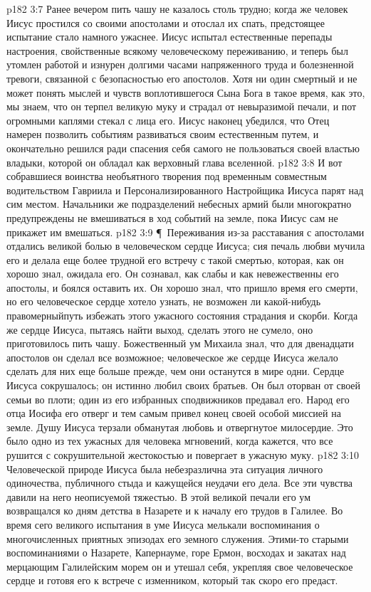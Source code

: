 \vs p182 3:7 Ранее вечером пить чашу не казалось столь трудно; когда же человек Иисус простился со своими апостолами и отослал их спать, предстоящее испытание стало намного ужаснее. Иисус испытал естественные перепады настроения, свойственные всякому человеческому переживанию, и теперь был утомлен работой и изнурен долгими часами напряженного труда и болезненной тревоги, связанной с безопасностью его апостолов. Хотя ни один смертный и не может понять мыслей и чувств воплотившегося Сына Бога в такое время, как это, мы знаем, что он терпел великую муку и страдал от невыразимой печали, и пот огромными каплями стекал с лица его. Иисус наконец убедился, что Отец намерен позволить событиям развиваться своим естественным путем, и окончательно решился ради спасения себя самого не пользоваться своей властью владыки, которой он обладал как верховный глава вселенной.
\vs p182 3:8 И вот собравшиеся воинства необъятного творения под временным совместным водительством Гавриила и Персонализированного Настройщика Иисуса парят над сим местом. Начальники же подразделений небесных армий были многократно предупреждены не вмешиваться в ход событий на земле, пока Иисус сам не прикажет им вмешаться.
\vs p182 3:9 \P\ Переживания из\hyp{}за расставания с апостолами отдались великой болью в человеческом сердце Иисуса; сия печаль любви мучила его и делала еще более трудной его встречу с такой смертью, которая, как он хорошо знал, ожидала его. Он сознавал, как слабы и как невежественны его апостолы, и боялся оставить их. Он хорошо знал, что пришло время его смерти, но его человеческое сердце хотело узнать, не возможен ли какой\hyp{}нибудь правомерныйпуть избежать этого ужасного состояния страдания и скорби. Когда же сердце Иисуса, пытаясь найти выход, сделать этого не сумело, оно приготовилось пить чашу. Божественный ум Михаила знал, что для двенадцати апостолов он сделал все возможное; человеческое же сердце Иисуса желало сделать для них еще больше прежде, чем они останутся в мире одни. Сердце Иисуса сокрушалось; он истинно любил своих братьев. Он был оторван от своей семьи во плоти; один из его избранных сподвижников предавал его. Народ его отца Иосифа его отверг и тем самым привел конец своей особой миссией на земле. Душу Иисуса терзали обманутая любовь и отвергнутое милосердие. Это было одно из тех ужасных для человека мгновений, когда кажется, что все рушится с сокрушительной жестокостью и повергает в ужасную муку.
\vs p182 3:10 Человеческой природе Иисуса была небезразлична эта ситуация личного одиночества, публичного стыда и кажущейся неудачи его дела. Все эти чувства давили на него неописуемой тяжестью. В этой великой печали его ум возвращался ко дням детства в Назарете и к началу его трудов в Галилее. Во время сего великого испытания в уме Иисуса мелькали воспоминания о многочисленных приятных эпизодах его земного служения. Этими\hyp{}то старыми воспоминаниями о Назарете, Капернауме, горе Ермон, восходах и закатах над мерцающим Галилейским морем он и утешал себя, укрепляя свое человеческое сердце и готовя его к встрече с изменником, который так скоро его предаст.
